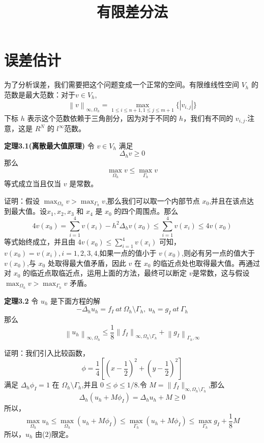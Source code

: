 \documentclass[12pt,a4paper]{article}
\title{有限差分法}
\date{\chntoday}
\begin{document}

\section{误差估计}
为了分析误差，我们需要把这个问题变成一个正常的空间。有限维线性空间 $V_h$ 的范数是最大范数：对于$v\in V_h$,
$$
\left \| v\right \|_{\infty,\Omega_h}=\max_{1\le i\le n+1,1\le j\le m+1}\lbrace |v_{i,j}|\rbrace
$$
下标 $h$ 表示这个范数依赖于三角剖分，因为对于不同的 $h$，我们有不同的 $v_{i,j}$.注意，这是 $R^N$ 的 $l^\infty$范数。

\textbf{定理3.1(离散最大值原理)}
令 $v\in V_h$ 满足
$$
\Delta _h v\ge0
$$
那么
$$
\max_{\Omega_h}v\le\max_{\Gamma_h}v
$$
等式成立当且仅当 $v$ 是常数。

证明：假设 $\max_{\Omega_h}v >\max_{\Gamma_h}v$,那么我们可以取一个内部节点 $x_0$,并且在该点达到最大值。设$x_1,x_2,x_3$ 和 $x_4$ 是 $x_0$ 的四个周围点。那么
$$
4v(x_0)=\sum_{i=1}^4 v(x_i)-h^2\Delta _h v(x_0)\le\sum_{i=1}^4 v(x_i)\le 4v(x_0)
$$
等式始终成立，并且由 $4v(x_0)\le\sum_{i=1}^4 v(x_i)$ 可知，$v(x_0)=v(x_i),i=1,2,3,4$,如果一点的值小于 $v(x_0)$,则必有另一点的值大于 $v(x_0)$,与 $x_0$ 处取得最大值矛盾，因此 $v$ 在 $x_0$ 的临近点处也取得最大值。再通过对 $x_0$ 的临近点取临近点，运用上面的方法，最终可以断定 $v$是常数，这与假设 $\max_{\Omega_h}v >\max_{\Gamma_h}v$ 矛盾。

\textbf{定理3.2}
令 $u_h$ 是下面方程的解
\begin{equation}
-\Delta_h u_h=f_I ~ at ~\Omega_h\setminus\Gamma_h,~ u_h=g_I ~ at ~ \Gamma_h
\end{equation}
那么
\begin{equation}
\left \| u_h\right \|_{\infty,\Omega_h}\le\frac{1}{8}\left \| f_I\right \|_{\infty,\Omega_h\setminus\Gamma_h}+\left \| g_I\right \|_{\Gamma_h,\infty}
\end{equation}

证明：我们引入比较函数，
$$
\phi=\frac{1}{4}\left[(x-\frac{1}{2})^2+(y-\frac{1}{2})^2\right]
$$
满足 $\Delta_h\phi_I=1$ 在 $\Omega_h\setminus\Gamma_h$,并且 $0\le\phi\le 1/8$.令 $M=\parallel f_I\parallel _{\infty,\Omega_h\setminus\Gamma_h}$,那么
$$
\Delta_h(u_h+M\phi_I)=\Delta_h u_h+M\ge 0
$$
所以，
$$
\max_{\Omega_h}u_h\le\max_{\Omega_h}(u_h+M\phi_I)\le\max_{\Gamma_h}(u_h+M\phi_I)\le\max_{\Gamma_h}g_I+\frac{1}{8}M
$$
所以，$u_h$ 由($2$)限定。
\end{document}
